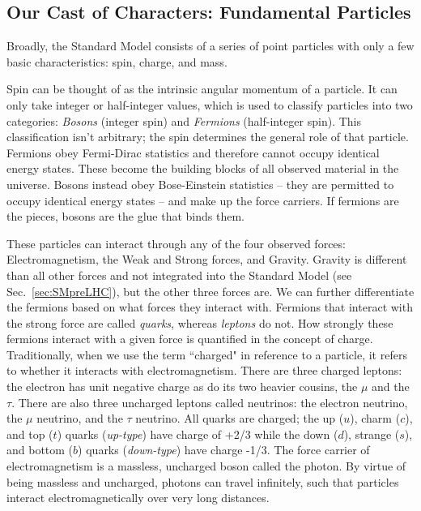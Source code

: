 \subsection{Our Cast of Characters: Fundamental Particles}
\label{sec:FundParticles}

Broadly, the Standard Model consists of a series of point particles with only a few basic characteristics: spin, charge, and mass.

Spin can be thought of as the intrinsic angular momentum of a particle. It can only take integer or half-integer values, which is used to classify particles into two categories: \textit{Bosons} (integer spin) and \textit{Fermions} (half-integer spin). This classification isn't arbitrary; the spin determines the general role of that particle. Fermions obey Fermi-Dirac statistics and therefore cannot occupy identical energy states. These become the building blocks of all observed material in the universe. Bosons instead obey Bose-Einstein statistics -- they are permitted to occupy identical energy states -- and make up the force carriers. If fermions are the pieces, bosons are the glue that binds them.

These particles can interact through any of the four observed forces: Electromagnetism, the Weak and Strong forces, and Gravity. Gravity is different than all other forces and not integrated into the Standard Model (see Sec.~\ref{sec:SMpreLHC}), but the other three forces are. We can further differentiate the fermions based on what forces they interact with. Fermions that interact with the strong force are called \textit{quarks}, whereas \textit{leptons} do not. How strongly these fermions interact with a given force is quantified in the concept of charge. Traditionally, when we use the term ``charged" in reference to a particle, it refers to whether it interacts with electromagnetism. There are three charged leptons: the electron has unit negative charge as do its two heavier cousins, the $\mu$ and the $\tau$. There are also three uncharged leptons called neutrinos: the electron neutrino, the $\mu$ neutrino, and the $\tau$ neutrino. All quarks are charged; the up ($u$), charm ($c$), and top ($t$) quarks (\textit{up-type}) have charge of +2/3 while the down ($d$), strange ($s$), and bottom ($b$) quarks (\textit{down-type}) have charge -1/3. The force carrier of electromagnetism is a massless, uncharged boson called the photon. By virtue of being massless and uncharged, photons can travel infinitely, such that particles interact electromagnetically over very long distances.

